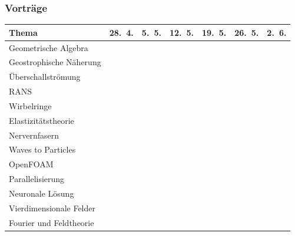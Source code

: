 %
%
%
\bgroup
\begin{frame}[t]
\setlength{\abovedisplayskip}{5pt}
\setlength{\belowdisplayskip}{5pt}
\frametitle{Vorträge}
\begin{center}
\def\c{\checkmark}
\begin{tabular}{|l|c|c|c|c|c|c|}
\hline
\bf Thema\raisebox{3pt}{\strut}          & \bf 28.~4. & \bf 5.~5. & \bf 12.~5. & \bf 19.~5. & \bf 26.~5. & \bf 2.~6. \\[2pt]
\hline
Geometrische Algebra     &   \c   &       &        &        &        &       \raisebox{1pt}{\strut}\\
Geostrophische Näherung  &   \c   &       &        &        &        &       \strut\\
\hline
Überschallströmung       &        &  \c   &        &        &        &       \raisebox{1pt}{\strut}\\
RANS                     &        &  \c   &        &        &        &       \strut\\
\hline
Wirbelringe              &        &       &   \c   &        &        &       \raisebox{1pt}{\strut}\\
Elastizitätstheorie      &        &       &   \c   &        &        &       \strut\\
\hline
Nervernfasern            &        &       &        &   \c   &        &       \raisebox{1pt}{\strut}\\
Waves to Particles       &        &       &        &   \c   &        &       \strut\\
\hline
OpenFOAM                 &        &       &        &        &   \c   &       \raisebox{1pt}{\strut}\\
Parallelisierung         &        &       &        &        &   \c   &       \strut\\
Neuronale Lösung         &        &       &        &        &   \c   &       \strut\\
\hline
Vierdimensionale Felder  &        &       &        &        &        &   \c  \raisebox{1pt}{\strut}\\
Fourier und Feldtheorie  &        &       &        &        &        &   \c  \strut\\
\hline
\end{tabular}
\end{center}
\end{frame}
\egroup
